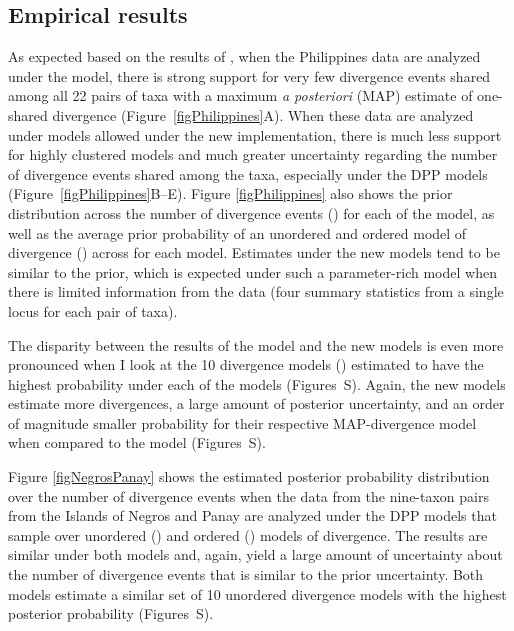 \subsection{Empirical results}
As expected based on the results of \citet{Oaks2012}, when the Philippines data
are analyzed under the \empModelOld model, there is strong support for very few
divergence events shared among all 22 pairs of taxa with a maximum \emph{a
posteriori} (MAP) estimate of one-shared divergence
(Figure~\ref{figPhilippines}A).
When these data are analyzed under models allowed under the new implementation,
there is much less support for highly clustered models and much greater
uncertainty regarding the number of divergence events shared among the taxa,
especially under the DPP models (Figure~\ref{figPhilippines}B--E).
Figure \ref{figPhilippines} also shows the prior distribution across the number
of divergence events (\divTimeNum) for each of the model, as well as the
average prior probability of an unordered and ordered model of divergence
(\divTimeIndexVector) across \divTimeNum for each model.
Estimates under the new models tend to be similar to the prior, which is
expected under such a parameter-rich model when there is limited information
from the data (four summary statistics from a single locus for each pair of
taxa).

The disparity between the results of the \empModelOld model and the new models
is even more pronounced when I look at the 10 divergence models
(\divTimeIndexVector) estimated to have the highest probability under each of the
models
(Figures~S).
Again, the new models estimate more divergences, a large amount of posterior
uncertainty, and an order of magnitude smaller probability for their respective
MAP-divergence model when compared to the \empModelOld model
(Figures~S).

Figure \ref{figNegrosPanay} shows the estimated posterior probability
distribution over the number of divergence events when the data from the
nine-taxon pairs from the Islands of Negros and Panay are analyzed under the DPP
models that sample over unordered (\npModelDPP) and ordered
(\npModelDPPOrdered) models of divergence.
The results are similar under both models and, again, yield a large amount of
uncertainty about the number of divergence events that is similar to the prior
uncertainty.
Both models estimate a similar set of 10 unordered divergence models with the
highest posterior probability
(Figures~S).

